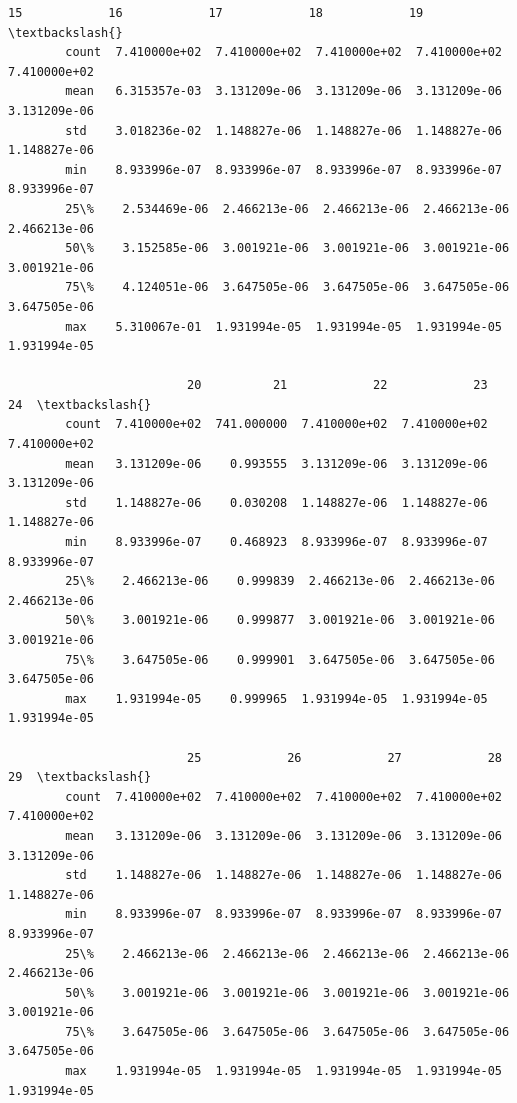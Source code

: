 \documentclass[11pt]{article}
\begin{document}
\begin{Verbatim}[commandchars=\\\{\}]
                         15            16            17            18            19  \textbackslash{}
        count  7.410000e+02  7.410000e+02  7.410000e+02  7.410000e+02  7.410000e+02   
        mean   6.315357e-03  3.131209e-06  3.131209e-06  3.131209e-06  3.131209e-06   
        std    3.018236e-02  1.148827e-06  1.148827e-06  1.148827e-06  1.148827e-06   
        min    8.933996e-07  8.933996e-07  8.933996e-07  8.933996e-07  8.933996e-07   
        25\%    2.534469e-06  2.466213e-06  2.466213e-06  2.466213e-06  2.466213e-06   
        50\%    3.152585e-06  3.001921e-06  3.001921e-06  3.001921e-06  3.001921e-06   
        75\%    4.124051e-06  3.647505e-06  3.647505e-06  3.647505e-06  3.647505e-06   
        max    5.310067e-01  1.931994e-05  1.931994e-05  1.931994e-05  1.931994e-05   
        
                         20          21            22            23            24  \textbackslash{}
        count  7.410000e+02  741.000000  7.410000e+02  7.410000e+02  7.410000e+02   
        mean   3.131209e-06    0.993555  3.131209e-06  3.131209e-06  3.131209e-06   
        std    1.148827e-06    0.030208  1.148827e-06  1.148827e-06  1.148827e-06   
        min    8.933996e-07    0.468923  8.933996e-07  8.933996e-07  8.933996e-07   
        25\%    2.466213e-06    0.999839  2.466213e-06  2.466213e-06  2.466213e-06   
        50\%    3.001921e-06    0.999877  3.001921e-06  3.001921e-06  3.001921e-06   
        75\%    3.647505e-06    0.999901  3.647505e-06  3.647505e-06  3.647505e-06   
        max    1.931994e-05    0.999965  1.931994e-05  1.931994e-05  1.931994e-05   
        
                         25            26            27            28            29  \textbackslash{}
        count  7.410000e+02  7.410000e+02  7.410000e+02  7.410000e+02  7.410000e+02   
        mean   3.131209e-06  3.131209e-06  3.131209e-06  3.131209e-06  3.131209e-06   
        std    1.148827e-06  1.148827e-06  1.148827e-06  1.148827e-06  1.148827e-06   
        min    8.933996e-07  8.933996e-07  8.933996e-07  8.933996e-07  8.933996e-07   
        25\%    2.466213e-06  2.466213e-06  2.466213e-06  2.466213e-06  2.466213e-06   
        50\%    3.001921e-06  3.001921e-06  3.001921e-06  3.001921e-06  3.001921e-06   
        75\%    3.647505e-06  3.647505e-06  3.647505e-06  3.647505e-06  3.647505e-06   
        max    1.931994e-05  1.931994e-05  1.931994e-05  1.931994e-05  1.931994e-05   
        

\end{Verbatim}
\end{document}
